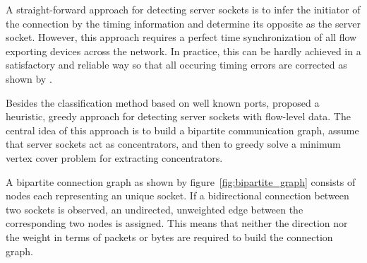 A straight-forward approach for detecting \glspl{server socket} is to infer the initiator of the connection by the timing information and determine its opposite as the \gls{server socket}. However, this approach requires a perfect time synchronization of all flow exporting devices across the network. In practice, this can be hardly achieved in a satisfactory and reliable way so that all occuring timing errors are corrected as shown by \citet{Trammell}.

Besides the classification method based on well known ports, \citet{Schatzmann:Mining,Schatzmann:Dissection,Schatzmann:Tracing} proposed a heuristic, greedy approach for detecting \glspl{server socket} with flow-level data. The central idea of this approach is to build a bipartite communication graph, assume that server sockets act as concentrators, and then to greedy solve a minimum vertex cover problem for extracting concentrators.

A bipartite connection graph as shown by figure \ref{fig:bipartite_graph} consists of nodes each representing an unique socket. If a bidirectional connection between two sockets is observed, an undirected, unweighted edge between the corresponding two nodes is assigned. This means that neither the direction nor the weight in terms of packets or bytes are required to build the connection graph.

